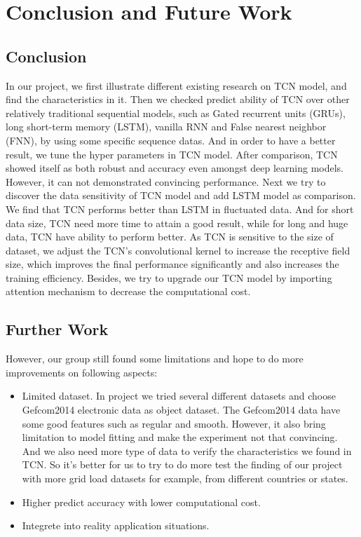 
\chapter{Conclusion and Future Work} %

\label{Chapter5} %


\section{Conclusion}
In our project, we first illustrate different existing research on TCN model, and find the characteristics in it. Then we checked predict ability of TCN over other relatively traditional sequential models, such as Gated recurrent units (GRUs), long short-term memory (LSTM), vanilla RNN and False nearest neighbor (FNN),  by using some specific sequence datas. And in order to have a better result, we tune the hyper parameters in TCN model. After comparison, TCN showed itself as both robust and accuracy even amongst deep learning models. However, it can not demonstrated convincing performance. Next we try to discover the data sensitivity of TCN model and add LSTM model as comparison. We find that TCN performs better than LSTM in fluctuated data. And for short data size, TCN need more time to attain a good result, while for long and huge data, TCN have ability to perform better. As TCN is sensitive to the size of dataset, we adjust the TCN's convolutional kernel to increase the receptive field size, which improves the final performance significantly and also increases the training efficiency. Besides, we try to upgrade our TCN model by importing attention mechanism to decrease the computational cost.

\section{Further Work}
However, our group still found some limitations and hope to do more improvements on following aspects:
\begin{itemize}
    \item Limited dataset. In project we tried several different datasets and choose Gefcom2014 electronic data as object dataset. The Gefcom2014 data have some good features such as regular and smooth. However, it also bring limitation to model fitting and make the experiment not that convincing. And we also need more type of data to verify the characteristics we found in TCN. So it's better for us to try to do more test the finding of our project with more grid load datasets for example, from different countries or states.
    \item Higher predict accuracy with lower computational cost.
    \item Integrete into reality application situations.
\end{itemize}